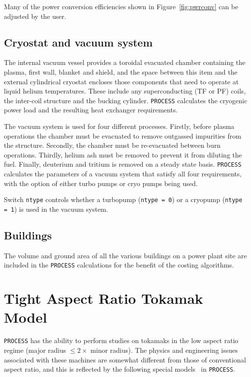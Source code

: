 \documentclass[11pt,a4paper]{report}
\newcommand{\process}{\mbox{\texttt{PROCESS}}}
\begin{document}
Many of the power conversion efficiencies shown in Figure~\ref{fig:pwrconv}
can be adjusted by the user.

\subsection{Cryostat and vacuum system}

The internal vacuum vessel provides a toroidal evacuated chamber containing the
plasma, first wall, blanket and shield, and the space between this item and
the external cylindrical cryostat encloses those components that need to
operate at liquid helium temperatures. These include any superconducting (TF
or PF) coils, the inter-coil structure and the bucking cylinder. \process\/
calculates the cryogenic power load and the resulting heat exchanger
requirements.

The vacuum system is used for four different processes. Firstly, before plasma
operations the chamber must be evacuated to remove outgassed impurities from
the structure. Secondly, the chamber must be re-evacuated between burn
operations. Thirdly, helium ash must be removed to prevent it from diluting
the fuel. Finally, deuterium and tritium is removed on a steady state
basis. \process\/ calculates the parameters of a vacuum system that satisfy
all four requirements, with the option of either turbo pumps or cryo pumps
being used.

Switch \texttt{ntype} controls whether a turbopump (\texttt{ntype = 0}) or a
cryopump (\texttt{ntype = 1}) is used in the vacuum system.

\subsection{Buildings}

The volume and ground area of all the various buildings on a power plant site
are included in the \process\/ calculations for the benefit of the costing
algorithms.

\section{Tight Aspect Ratio Tokamak Model}
\label{sec:tart}

\process\/ has the ability to perform studies on tokamaks in the low aspect ratio
regime (major radius $\leq 2 \times$ minor radius). The physics and
engineering issues~\cite{tart} associated with these machines are somewhat
different from those of conventional aspect ratio, and this is reflected by
the following special models~\cite{storac} in \process.
\end{document}
